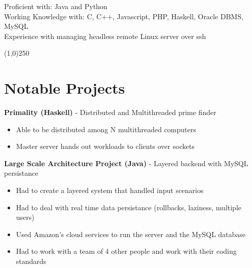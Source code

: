 \documentclass[margin,line, 11pt]{resume}
\begin{document}
\begin{resume}
    Proficient with: Java and Python							\vspace{2mm}\\						
    Working Knowledge with: C, C++, Javascript, PHP, Haskell, Oracle DBMS, MySQL					\vspace{2mm}\\
    Experience with managing headless remote Linux server over ssh
    
    \vspace{-5mm}
    \line(1,0){250}
    
    
    \section{\mysidestyle \textbf {Notable Projects}}
    
    \vspace{0mm}

     \textbf{Primality (Haskell)} - Distributed and Multithreaded prime finder
     \begin{itemize}
      \item Able to be distributed among N multithreaded computers
      \item Master server hands out workloads to clients over sockets
     \end{itemize}

     \textbf{Large Scale Architecture Project (Java)} - Layered backend with MySQL persistance
     \begin{itemize}
      \item Had to create a layered system that handled input scenarios
      \item Had to deal with real time data persistance (rollbacks, laziness, multiple users)
      \item Used Amazon's cloud services to run the server and the MySQL database
      \item Had to work with a team of 4 other people and work with their coding standards
     \end{itemize}
% 


\end{resume}
\end{document}
